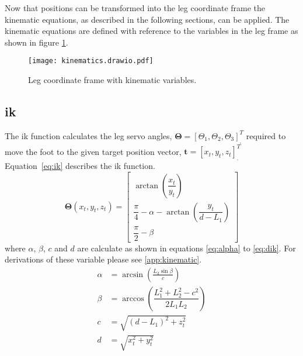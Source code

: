         Now that positions can be transformed into the leg coordinate frame the kinematic equations, as described in the following sections, can be applied. The kinematic equations are defined
        with reference to the variables in the leg frame as shown in figure \ref{fig:kinematics}.
        \begin{figure}[h]
            \centering
            \texttt{[image: kinematics.drawio.pdf]}
            \caption{Leg coordinate frame with kinematic variables.}
            \label{fig:kinematics}
        \end{figure}

    \subsection{\acf{ik}}
        The \ac{ik} function calculates the leg servo angles, \(\bm{\Theta} = [\Theta_1, \Theta_2, \Theta_3]^T_{\displaystyle ,}\) required
        to move the foot to the given target position vector, \(\bm{t} = [x_t,y_t,z_t]^T_{\displaystyle .}\)
        \hbox{Equation \ref{eq:ik}} describes the \ac{ik} function.
        \begin{equation}\label{eq:ik}
            \bm{\Theta}(x_t,y_t,z_t) =
                                \begin{bmatrix}
                                    \arctan{\left(\dfrac{x_t}{y_t}\right)}\\[0.5cm]
                                    \dfrac{\pi}{4} - \alpha - \arctan{\left(\dfrac{y_t}{d-L_1}\right)}\\[0.5cm]
                                    \dfrac{\pi}{2} - \beta
                                \end{bmatrix}
        \end{equation}
        where \(\alpha\), \(\beta\), \(c\) and \(d\) are calculate as shown in equations \ref{eq:alpha} to \ref{eq:dik}. For derivations of these variable
        please see \ref{app:kinematic}.
        \begin{align}
            \alpha &= \arcsin{\left(\frac{L_3\sin{\beta}}{c}\right)} \label{eq:alpha} \\[0.5cm]
            \beta &= \arccos{\left(\dfrac{L_1^2 + L_2^2 -c^2}{2L_1L_2}\right)}\\[0.5cm]
            c &= \sqrt{(d-L_1)^2+z_t^2}\\[0.5cm]
            d &= \sqrt{x_t^2 + y_t^2} \label{eq:dik}
        \end{align}

